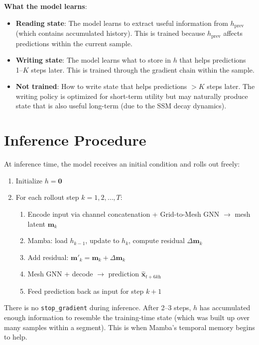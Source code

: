 \documentclass[11pt,a4paper]{article}
\begin{document}
\textbf{What the model learns}:
\begin{itemize}[nosep]
  \item \textbf{Reading state}: The model learns to extract useful information from $h_\text{prev}$ (which contains accumulated history). This is trained because $h_\text{prev}$ affects predictions within the current sample.
  \item \textbf{Writing state}: The model learns what to store in $h$ that helps predictions 1--$K$ steps later. This is trained through the gradient chain within the sample.
  \item \textbf{Not trained}: How to write state that helps predictions $> K$ steps later. The writing policy is optimized for short-term utility but may naturally produce state that is also useful long-term (due to the SSM decay dynamics).
\end{itemize}

\section{Inference Procedure}

At inference time, the model receives an initial condition and rolls out freely:

\begin{enumerate}[nosep]
  \item Initialize $h = \mathbf{0}$
  \item For each rollout step $k = 1, 2, \ldots, T$:
  \begin{enumerate}[nosep]
    \item Encode input via channel concatenation + Grid-to-Mesh GNN $\to$ mesh latent $\mathbf{m}_k$
    \item Mamba: load $h_{k-1}$, update to $h_k$, compute residual $\Delta\mathbf{m}_k$
    \item Add residual: $\mathbf{m}'_k = \mathbf{m}_k + \Delta\mathbf{m}_k$
    \item Mesh GNN + decode $\to$ prediction $\hat{\mathbf{x}}_{t+6k\text{h}}$
    \item Feed prediction back as input for step $k{+}1$
  \end{enumerate}
\end{enumerate}

There is no \texttt{stop\_gradient} during inference. After 2--3 steps, $h$ has accumulated enough information to resemble the training-time state (which was built up over many samples within a segment). This is when Mamba's temporal memory begins to help.
\end{document}
